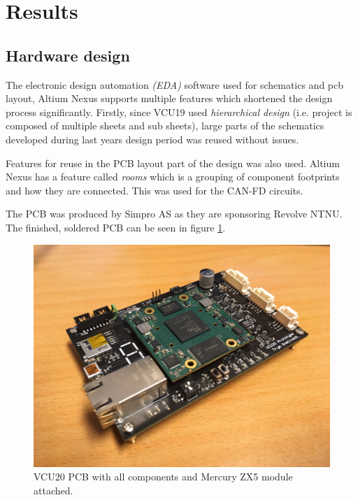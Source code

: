 \section{Results}

\subsection{Hardware design}



The electronic design automation \emph{(EDA)} software used for schematics and pcb layout, Altium Nexus \cite{altium} supports multiple features which shortened the design process significantly. Firstly, since VCU19 used \emph{hierarchical design} (i.e. project is composed of multiple sheets and sub sheets), large parts of the schematics developed during last years design period was reused without issues. 

Features for reuse in the PCB layout part of the design was also used. Altium Nexus has a feature called \emph{rooms} which is a grouping of component footprints and how they are connected. This was used for the CAN-FD circuits.

The PCB was produced by Simpro AS as they are sponsoring Revolve NTNU. The finished, soldered PCB can be seen in figure \ref{fig:vcu20_soldered}.

\begin{figure}[H]
    \centering
    \includegraphics[width=.85\textwidth]{media/vcu20.JPG}
    \caption{VCU20 PCB with all components and Mercury ZX5 module attached.}
    \label{fig:vcu20_soldered}
\end{figure}

